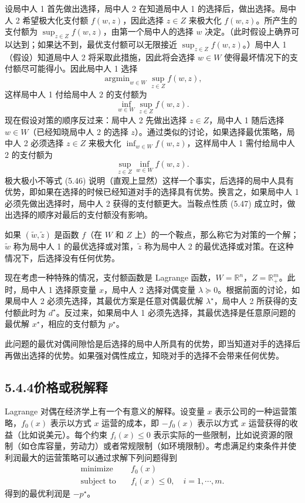 \documentclass[UTF8,12pt,a4paper,fontset=fandol]{ctexart}
\begin{document}
设局中人 1 首先做出选择，局中人 2 在知道局中人 1 的选择后，做出选择。局中人 2 希望极大化支付额 $f(w,z)$，因此选择 $z\in Z$ 来极大化 $f(w,z)$。所产生的支付额为 $\sup_{z\in Z} f(w,z)$，由第一个局中人的选择 $w$ 决定。（此时假设上确界可以达到；如果达不到，最优支付额可以无限接近 $\sup_{z\in Z} f(w,z)$。）局中人 1（假设）知道局中人 2 将采取此措施，因此将会选择 $w\in W$ 使得最坏情况下的支付额尽可能得小。因此局中人 1 选择
\[
\mathop{\mathrm{argmin}}_{w\in W}\sup_{z\in Z} f(w,z),
\]
这样局中人 1 付给局中人 2 的支付额为
\[
\inf_{w\in W}\sup_{z\in Z} f(w,z).
\]
现在假设对策的顺序反过来：局中人 2 先做出选择 $z\in Z$，局中人 1 随后选择 $w\in W$（已经知晓局中人 2 的选择 $z$）。通过类似的讨论，如果选择最优策略，局中人 2 必须选择 $z\in Z$ 来极大化 $\inf_{w\in W}f(w,z)$，这样局中人 1 需付给局中人 2 的支付额为
\[
\sup_{z\in Z}\inf_{w\in W} f(w,z).
\]
极大极小不等式 (5.46) 说明（直观上显然）这样一个事实，后选择的局中人具有优势，即如果在选择的时候已经知道对手的选择具有优势。换言之，如果局中人 1 必须先做出选择时，局中人 2 获得的支付额更大。当鞍点性质 (5.47) 成立时，做出选择的顺序对最后的支付额没有影响。

如果 $(\tilde{w},\tilde{z})$ 是函数 $f$（在 $W$ 和 $Z$ 上）的一个鞍点，那么称它为对策的一个解；$\tilde{w}$ 称为局中人 1 的最优选择或对策，$\tilde{z}$ 称为局中人 2 的最优选择或对策。在这种情况下，后选择没有任何优势。

现在考虑一种特殊的情况，支付额函数是 Lagrange 函数，$W=\mathbb{R}^n$，$Z=\mathbb{R}_+^m$。此时，局中人 1 选择原变量 $x$，局中人 2 选择对偶变量 $\lambda\succeq 0$。根据前面的讨论，如果局中人 2 必须先选择，其最优方案是任意对偶最优解 $\lambda^\star$，局中人 2 所获得的支付额此时为 $d^\star$。反过来，如果局中人 1 必须先选择，其最优选择是任意原问题的最优解 $x^\star$，相应的支付额为 $p^\star$。

此问题的最优对偶间隙恰是后选择的局中人所具有的优势，即当知道对手的选择后再做出选择的优势。如果强对偶性成立，知晓对手的选择不会带来任何优势。

\subsection*{5.4.4\quad 价格或税解释}

Lagrange 对偶在经济学上有一个有意义的解释。设变量 $x$ 表示公司的一种运营策略，$f_0(x)$ 表示以方式 $x$ 运营的成本，即 $-f_0(x)$ 表示以方式 $x$ 运营获得的收益（比如说美元）。每个约束 $f_i(x)\leq 0$ 表示实际的一些限制，比如说资源的限制（如仓库容量，劳动力）或者常规限制（如环境限制）。考虑满足约束条件并使利润最大的运营策略可以通过求解下列问题得到
\[
\begin{aligned}
\text{minimize}\quad & f_0(x)\\
\text{subject to}\quad & f_i(x)\leq 0,\quad i=1,\cdots,m.
\end{aligned}
\]
得到的最优利润是 $-p^\star$。
\end{document}
